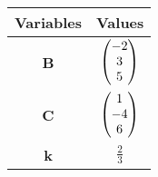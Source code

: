 \begin{tabular}{|c|c|}
\hline
\textbf{Variables} & \textbf{Values}\\
\hline
\textbf{B} & $\begin{pmatrix}-2\\3\\5\end{pmatrix}$\\
\hline
\textbf{C} & $\begin{pmatrix}1\\-4\\6\end{pmatrix}$\\
\hline
\textbf{k} & $\frac{2}{3}$\\
\hline
\end{tabular}
